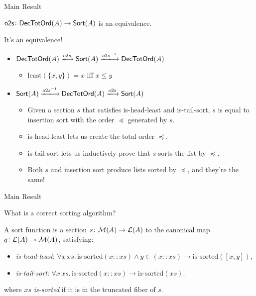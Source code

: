\documentclass[9pt]{beamer}
\begin{document}
\begin{frame}{Main Result}

\begin{tblock}
    $\operatorname{\mathsf{o2s}}\colon \mathsf{DecTotOrd}(A) \to \mathsf{Sort}(A)$ is an equivalence.
\end{tblock}

It's an equivalence!
\begin{itemize}
    \item $\type{DecTotOrd}(A) \xto{o2s} \type{Sort}(A) \xto{o2s^{-1}} \type{DecTotOrd}(A)$
    \begin{itemize}
        \item $\text{least}(\{x, y\}) = x \text{ iff } x \leq y$
    \end{itemize}

    \item $\type{Sort}(A) \xto{o2s^{-1}} \type{DecTotOrd}(A) \xto{o2s} \type{Sort}(A)$
    \begin{itemize}
        \item Given a section $s$ that satisfies \alert{is-head-least} and \alert{is-tail-sort},
              $s$ is equal to insertion sort with the order $\preceq$ generated by $s$.
        \item \alert{is-head-least} lets us create the \alert{total order} $\preceq$.
        \item \alert{is-tail-sort} lets us inductively prove that $s$ \alert{sorts} the list by $\preceq$.
        \item Both $s$ and insertion sort produce lists sorted by $\preceq$, and they're the same!
    \end{itemize}
\end{itemize}

\end{frame}


\begin{frame}{Main Result}

  \begin{qblock}
    What is a correct sorting algorithm?
  \end{qblock}

  \begin{pblock}[Answer]
  A sort function is a section $s\colon \mathcal{M}(A) \to \mathcal{L}(A)$ to the canonical map $q\colon \mathcal{L}(A) \twoheadrightarrow \mathcal{M}(A)$,
  satisfying:
  \begin{itemize}
      \item \textit{is-head-least}: $\forall x \, xs. \, \text{is-sorted}(x :: xs) \land y \in (x :: xs) \to \text{is-sorted}([x, y])$,
      \item \textit{is-tail-sort}: $\forall x \, xs. \, \text{is-sorted}(x :: xs) \to \text{is-sorted}(xs)$.
  \end{itemize}
  where $xs$ \textit{is-sorted} if it is in the truncated fiber of $s$.
  \end{pblock}
\end{frame}
\end{document}
